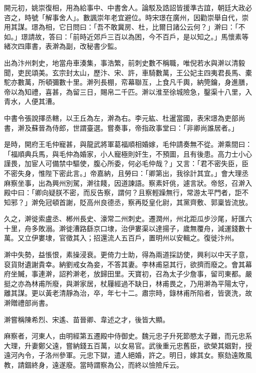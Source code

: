 \begin{pinyinscope}
 開元初，姚崇復相，用為給事中、中書舍人。論駁及誥詔皆援準古誼，朝廷大政必咨之，時號「解事舍人」。數諷崇年老宜避位。時宋璟在廣州，因勸崇舉自代，崇用其謀。璟為相，它日問曰：「吾不敢冀房、杜，比爾日諸公云何？」澣曰：「不如。」璟請故，答曰：「前時近郊戶三百以為困，今不百戶，是以知之。」馬懷素等緒次四庫書，表澣為副，改秘書少監。



 出為汴州刺史，地當舟車湊集，事浩繁，前刺史數不稱職，唯倪若水與澣以清毅聞，吏民頌美。玄宗封太山，歷汴、宋、許，車騎數萬，王公妃主四夷君長馬、橐駝亦數萬，所頓彌數十里。澣列長棚，帟幕聯亙，上食凡千輿，納筦鑰，身進膳，帝以為知禮，喜甚，為留三日，賜帛二千匹。澣以淮至徐城險急，鑿渠十八里，入青水，人便其漕。



 中書令張說擇丞轄，以王丘為左，澣為右。李元紘、杜暹當國，表宋璟為吏部尚書，澣及蘇晉為侍郎，世謂臺選。嘗奏事，帝指政事堂曰：「非卿尚誰居者。」



 是時，開府王毛仲寵甚，與龍武將軍葛福順相婚嫁，毛仲請奏無不從。澣乘間曰：「福順典兵馬，與毛仲為婚家，小人寵極則奸生，不預圖，且有後患。高力士小心謹畏，加宦人可備禁中驅使，腹心所委，何必毛仲哉？」又言：「君不密失臣，臣不密失身，惟陛下密此言。」帝嘉納，且勞曰：「卿第出，我徐計其宜。」會大理丞麻察坐事，出為興州別駕，澣往餞，因道諫語。察素奸佻，遽言狀。帝怒，召澣入殿中曰：「卿向疑朕不密，而反告察，謂何？且察輕躁無行，常游太平門者，詎不知邪？」澣免冠頓首謝，貶高州良德丞，察再貶皇化尉，其黨齊敷、郭稟皆流放。



 久之，澣徙索盧丞、郴州長史、濠常二州刺史。遷潤州，州北距瓜步沙尾，紆匯六十里，舟多敗溺。澣徙漕路繇京口埭，治伊婁渠以達揚子，歲無覆舟，減運錢數十萬。又立伊婁埭，官徵其入；招還流人五百戶，置明州以安輯之。復徙汴州。



 澣中失勢，益悵恨，素操浸衰。更倚力士助，得為兩道採訪使，興利以中天子意，裒貨財遺謝貴幸。納劉戒女為妾，不答其妻。李林甫惡其行，欲擠而廢之。會其幕府坐贓，事連澣，詔矜澣老，放歸田里。天寶初，召為太子少詹事，留司東都。嚴挺之亦為林甫所廢，與澣家居，杖屨經過不缺日，林甫畏之，乃用澣為平陽太守，離其謀。更以黃老清靜為治，卒，年七十二。肅宗時，錄林甫所陷者，皆褒洗，故澣贈禮部尚書。



 澣嘗稱陳希烈、宋遙、苗晉卿、韋述之才，後皆大顯。



 麻察者，河東人，由明經第五遷殿中侍御史。魏元忠子升死節愍太子難，而元忠系大理，升妻鄭父遠，嘗納錢五百萬，以女易官。武後重元忠舊臣，欲榮其姻對，授遠河內令，子洛州參軍。元忠下獄，遣人絕婚，許之。明日，嫁其女。察劾遠敗風教，請錮終身，遠遂廢。當時謂察為公，而終以憸險斥云。




\end{pinyinscope}
